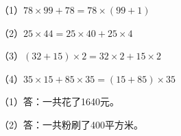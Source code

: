 
\begingroup\color{answerred}\noindent（1）$78\times99+78=78\times(99+1)$\par
\noindent（2）$25\times44=25\times40+25\times4$\par
\noindent（3）$(32+15)\times2=32\times2+15\times2$\par
\noindent（4）$35\times15+85\times35=(15+85)\times35$\par\par\endgroup
{}
\begingroup\color{answerred}\par\endgroup
{}
\begingroup\color{answerred}\noindent（1）答：一共花了1640元。\par
\noindent（2）答：一共粉刷了400平方米。\par\par\endgroup
